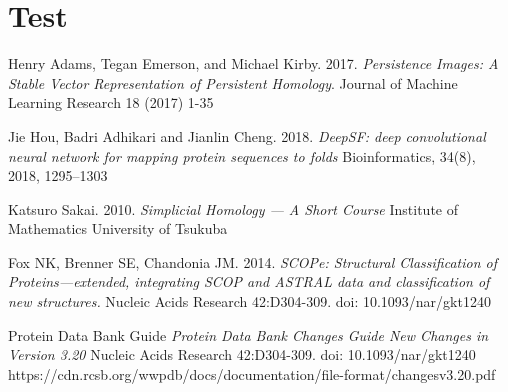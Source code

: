 \documentclass[12pt, a4paper, twocolumn, fullpage]{article}
\theoremstyle{plain}
\theoremstyle{definition}
\theoremstyle{remark}
\begin{document}
\section*{Test}
\begin{thebibliography}{9}

Henry Adams, Tegan Emerson, and Michael Kirby. 
2017.
\textit{Persistence Images: A Stable Vector Representation of
Persistent Homology}. 
Journal of Machine Learning Research 18 (2017) 1-35

Jie Hou, Badri Adhikari and Jianlin Cheng.
2018.
\textit{DeepSF: deep convolutional neural network for mapping protein sequences to folds}
Bioinformatics, 34(8), 2018, 1295–1303

Katsuro Sakai.
2010.
\textit{Simplicial Homology — A Short Course}
Institute of Mathematics University of Tsukuba

Fox NK, Brenner SE, Chandonia JM.
2014.
\textit{SCOPe: Structural Classification of Proteins—extended, integrating SCOP and ASTRAL data and classification of new structures.}
Nucleic Acids Research 42:D304-309. doi: 10.1093/nar/gkt1240


Protein Data Bank Guide
\textit{Protein Data Bank Changes Guide
	New Changes in Version 3.20}
Nucleic Acids Research 42:D304-309. doi: 10.1093/nar/gkt1240
https://cdn.rcsb.org/wwpdb/docs/documentation/file-format/changesv3.20.pdf

\end{thebibliography}
\end{document}
